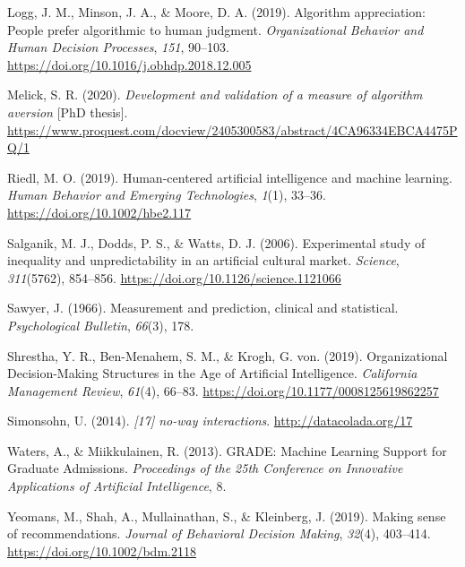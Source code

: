 \documentclass[
  man ,floatsintext]{apa7}
\newlength{\cslhangindent}
\newlength{\cslentryspacingunit} %
\newenvironment{CSLReferences}[2] %
 {%
  \setlength{\parindent}{0pt}
  \ifodd #1
  \let\oldpar\par
  \def\par{\hangindent=\cslhangindent\oldpar}
  \fi
  \setlength{\parskip}{#2\cslentryspacingunit}
 }%
 {}
\begin{document}
\begin{CSLReferences}{1}{0}
\leavevmode{}%
Logg, J. M., Minson, J. A., \& Moore, D. A. (2019). Algorithm appreciation: People prefer algorithmic to human judgment. \emph{Organizational Behavior and Human Decision Processes}, \emph{151}, 90--103. \url{https://doi.org/10.1016/j.obhdp.2018.12.005}

\leavevmode{}%
Melick, S. R. (2020). \emph{Development and validation of a measure of algorithm aversion} {[}PhD thesis{]}. \url{https://www.proquest.com/docview/2405300583/abstract/4CA96334EBCA4475PQ/1}

\leavevmode{}%
Riedl, M. O. (2019). Human{-}centered artificial intelligence and machine learning. \emph{Human Behavior and Emerging Technologies}, \emph{1}(1), 33--36. \url{https://doi.org/10.1002/hbe2.117}

\leavevmode{}%
Salganik, M. J., Dodds, P. S., \& Watts, D. J. (2006). Experimental study of inequality and unpredictability in an artificial cultural market. \emph{Science}, \emph{311}(5762), 854--856. \url{https://doi.org/10.1126/science.1121066}

\leavevmode{}%
Sawyer, J. (1966). Measurement and prediction, clinical and statistical. \emph{Psychological Bulletin}, \emph{66}(3), 178.

\leavevmode{}%
Shrestha, Y. R., Ben-Menahem, S. M., \& Krogh, G. von. (2019). Organizational Decision-Making Structures in the Age of Artificial Intelligence. \emph{California Management Review}, \emph{61}(4), 66--83. \url{https://doi.org/10.1177/0008125619862257}

\leavevmode{}%
Simonsohn, U. (2014). \emph{{[}17{]} no-way interactions}. \url{http://datacolada.org/17}

\leavevmode{}%
Waters, A., \& Miikkulainen, R. (2013). GRADE: Machine Learning Support for Graduate Admissions. \emph{Proceedings of the 25th Conference on Innovative Applications of Artificial Intelligence}, 8.

\leavevmode{}%
Yeomans, M., Shah, A., Mullainathan, S., \& Kleinberg, J. (2019). Making sense of recommendations. \emph{Journal of Behavioral Decision Making}, \emph{32}(4), 403--414. \url{https://doi.org/10.1002/bdm.2118}

\end{CSLReferences}
\end{document}
